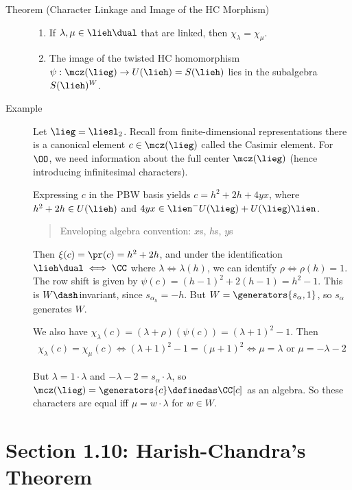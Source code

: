 \begin{description}
\item[Theorem (Character Linkage and Image of the HC Morphism)]
\hfill

\begin{enumerate}
\def\labelenumi{\alph{enumi}.}
\item
  If \(\lambda, \mu \in \lieh\dual\) that are linked, then
  \(\chi_\lambda = \chi_\mu\).
\item
  The image of the twisted HC homomorphism
  \(\psi: \mcz(\lieg) \to U(\lieh) = S(\lieh)\) lies in the subalgebra
  \(S(\lieh)^W\).
\end{enumerate}
\item[Example]
Let \(\lieg = \liesl_2\). Recall from finite-dimensional representations
there is a canonical element \(c\in \mcz(\lieg)\) called the Casimir
element. For \(\OO\), we need information about the full center
\(\mcz(\lieg)\) (hence introducing infinitesimal characters).

Expressing \(c\) in the PBW basis yields \(c = h^2 + 2h + 4yx\), where
\(h^2 + 2h \in U(\lieh)\) and
\(4yx \in \lien^- U(\lieg) + U(\lieg) \lien\).

\begin{quote}
Enveloping algebra convention: \(x\)s, \(h\)s, \(y\)s
\end{quote}

Then \(\xi(c) = \pr(c) = h^2 + 2h\), and under the identification
\(\lieh\dual \iff \CC\) where \(\lambda \iff \lambda(h)\), we can
identify \(\rho \iff \rho(h) = 1\). The row shift is given by
\(\psi(c) = (h-1)^2 + 2(h-1) = h^2 - 1\). This is \(W\dash\)invariant,
since \(s_{\alpha_h} = -h\). But \(W = \generators{s_\alpha, 1}\), so
\(s_\alpha\) generates \(W\).

We also have
\(\chi_\lambda(c) = (\lambda + \rho) (\psi(c)) = (\lambda+1)^2 - 1\).
Then
\begin{align*}
\chi_\lambda(c) = \chi_\mu(c) \iff (\lambda+1)^2 - 1 = (\mu + 1)^2 \iff \mu = \lambda \text{ or } \mu = -\lambda - 2
\end{align*}

But \(\lambda = 1 \cdot \lambda\) and
\(-\lambda - 2 = s_\alpha \cdot \lambda\), so
\(\mcz(\lieg) = \generators{c} \definedas \CC[c]\) as an algebra. So
these characters are equal iff \(\mu = w\cdot \lambda\) for \(w\in W\).
\end{description}

\hypertarget{section-1.10-harish-chandras-theorem}{%
\section{Section 1.10: Harish-Chandra's
Theorem}\label{section-1.10-harish-chandras-theorem}}

